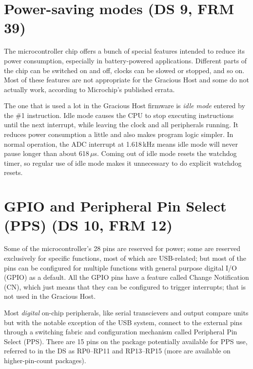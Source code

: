 
\section{Power-saving modes (DS 9, FRM 39)}

The microcontroller chip offers a bunch of special features intended to
reduce its power consumption, especially in battery-powered applications. 
Different parts of the chip can be switched on and off, clocks can be
slowed or stopped, and so on.  Most of these features are not appropriate
for the Gracious Host and some do not actually work, according to
Microchip's published errata.

The one that is used a lot in the Gracious Host firmware is \emph{idle mode}
entered by the  \#1 instruction.  Idle mode causes the CPU to
stop executing instructions until the next interrupt, while leaving the
clock and all peripherals running.  It reduces power consumption a little
and also makes program logic simpler.  In normal operation, the ADC
interrupt at 1.618\,kHz means idle mode will never pause longer than about
618\,$\mu$s.  Coming out of idle mode resets the watchdog timer, so regular
use of idle mode makes it unnecessary to do explicit watchdog resets.


\section{GPIO and Peripheral Pin Select (PPS) (DS 10, FRM 12)}

Some of the microcontroller's 28 pins are reserved for power; some are
reserved exclusively for specific functions, most of which are USB-related;
but most of the pins can be configured for multiple functions with general
purpose digital I/O (GPIO) as a default.  All the GPIO pins have a feature
called Change Notification (CN), which just means that they can be
configured to trigger interrupts; that is not used in the Gracious Host.

Most \emph{digital} on-chip peripherals, like serial transcievers and output
compare units but with the notable exception of the USB system, connect to
the external pins through a switching fabric and configuration mechanism
called Peripheral Pin Select (PPS).  There are 15 pins on the package
potentially available for PPS use, referred to in the DS as RP0--RP11 and
RP13--RP15 (more are available on higher-pin-count packages).

